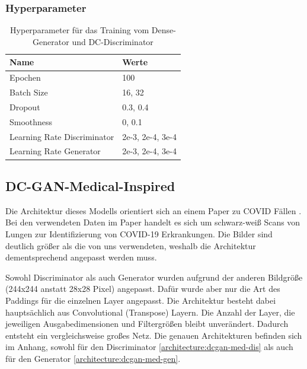 \subsubsection{Hyperparameter}
\begin{table}[H]
	\centering
	\begin{tabular}{l l}
		Name                        & Werte            \\ \hline
		Epochen                     & 100              \\
		Batch Size                  & 16, 32           \\
		Dropout                     & 0.3, 0.4         \\
		Smoothness                  & 0, 0.1           \\
		Learning Rate Discriminator & 2e-3, 2e-4, 3e-4 \\
		Learning Rate Generator     & 2e-3, 2e-4, 3e-4
	\end{tabular}
	\caption{Hyperparameter für das Training vom Dense-Generator und DC-Discriminator}
\end{table}

\subsection{DC-GAN-Medical-Inspired}
Die Architektur dieses Modells orientiert sich an einem Paper zu COVID Fällen \cite{inspiration-dc-gan-med}.
Bei den verwendeten Daten im Paper handelt es sich um schwarz-weiß Scans von Lungen zur Identifizierung von COVID-19 Erkrankungen.
Die Bilder sind deutlich größer als die von uns verwendeten, weshalb die Architektur dementsprechend angepasst werden muss.

Sowohl Discriminator als auch Generator wurden aufgrund der anderen Bildgröße (244x244 anstatt 28x28 Pixel) angepasst.
Dafür wurde aber nur die Art des Paddings für die einzelnen Layer angepasst.
Die Architektur besteht dabei hauptsächlich aus Convolutional (Transpose) Layern.
Die Anzahl der Layer, die jeweiligen Ausgabedimensionen und Filtergrößen bleibt unverändert.
Dadurch entsteht ein vergleichsweise großes Netz.
Die genauen Architekturen befinden sich im Anhang, sowohl für den Discriminator \cref{architecture:dcgan-med-dis} als auch für den Generator \cref{architecture:dcgan-med-gen}.

